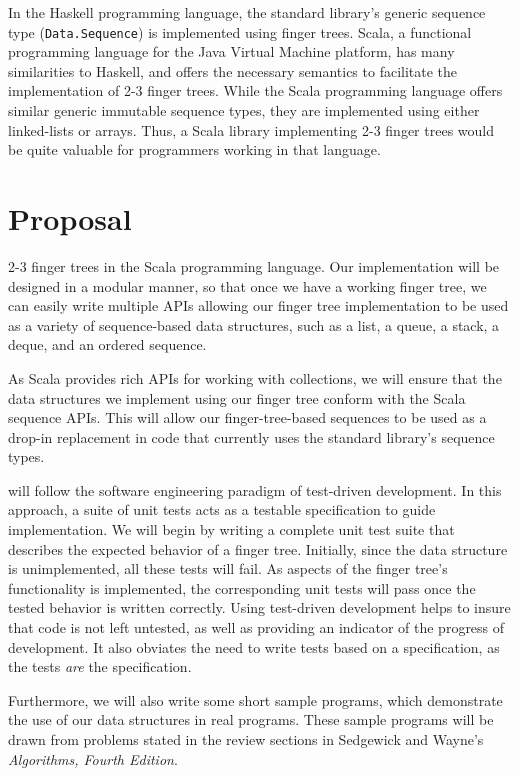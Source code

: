 \documentclass[a4paper,nobib]{tufte-handout}
\begin{document}
In the Haskell programming language, the standard library's generic sequence type (\Verb|Data.Sequence|) is implemented using finger trees.\cite[-1in]{data_sequence} Scala, a functional programming language for the Java Virtual Machine platform, has many similarities to Haskell,\cite{odersky2004overview} and offers the necessary semantics to facilitate the implementation of 2-3 finger trees. While the Scala programming language offers similar generic immutable sequence types, they are implemented using either linked-lists or arrays.\cite{scala_std} Thus, a Scala library implementing 2-3 finger trees would be quite valuable for programmers working in that language.

\section{Proposal}

 2-3 finger trees in the Scala programming language. Our implementation will be designed in a modular manner, so that once we have a working finger tree, we can easily write multiple APIs allowing our finger tree implementation to be used as a variety of sequence-based data structures, such as a list, a queue, a stack, a deque, and an ordered sequence.

As Scala provides rich APIs for working with collections, we will ensure that the data structures we implement using our finger tree conform with the Scala sequence APIs. This will allow our finger-tree-based sequences to be used as a drop-in replacement in code that currently uses the standard library's sequence types.

 will follow the software engineering paradigm of test-driven development. In this approach, a suite of unit tests acts as a testable specification to guide implementation. We will begin by writing a complete unit test suite that describes the expected behavior of a finger tree. Initially, since the data structure is unimplemented, all these tests will fail. As aspects of the finger tree's functionality is implemented, the corresponding unit tests will pass once the tested behavior is written correctly. Using test-driven development helps to insure that code is not left untested, as well as providing an indicator of the progress of development. It also obviates the need to write tests based on a specification, as the tests \textit{are} the specification.

Furthermore, we will also write some short sample programs, which demonstrate the use of our data structures in real programs. These sample programs will be drawn from problems stated in the review sections in Sedgewick and Wayne's \textit{Algorithms, Fourth Edition}.
\end{document}
